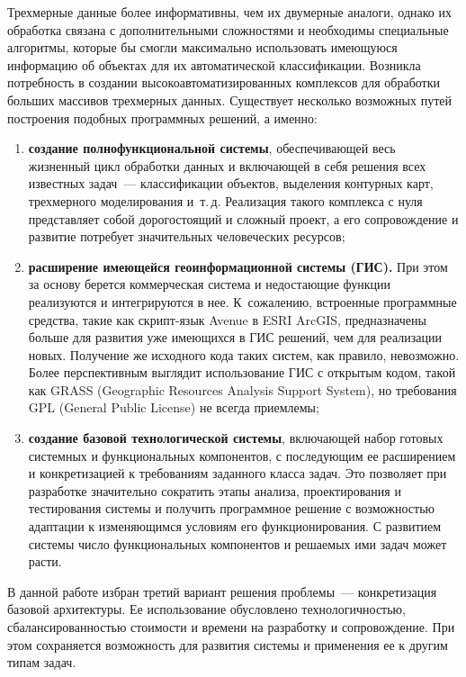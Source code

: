 \begin{multicols}{2}
Трехмерные данные более информативны, чем их двумерные аналоги, однако их 
обработка связана с дополнительными сложностями и необходимы 
специальные алгоритмы, которые бы смогли максимально использовать 
имеющуюся информацию об объектах для их автоматической классификации. 
Возникла потребность в создании высокоавтоматизированных комплексов для 
обработки больших массивов трехмерных данных. Существует несколько возможных 
путей построения подобных программных решений, а именно:
   \begin{enumerate}[(1)]
   \item \textbf{создание полнофункциональной системы}, обеспечивающей 
весь жизненный цикл обработки данных и включающей в себя решения всех 
известных задач~--- классификации объектов, выделения контурных карт, 
трехмерного моделирования и~т.\,д. Реализация такого комплекса с нуля 
представляет собой дорогостоящий и сложный проект, а его сопровождение и 
развитие потребует значительных человеческих ресурсов;
\item \textbf{расширение имеющейся геоинформационной сис\-те\-мы (ГИС).} При этом за основу берется 
коммерческая система и не\-дос\-та\-ющие функции реализуются и интегрируются в 
нее. К~сожалению, встроенные программные средства, такие как скрипт-язык 
Avenue в ESRI ArcGIS, предназначены больше для развития уже имеющихся в 
ГИС решений, чем для реализации новых. Получение же исходного кода таких 
систем, как правило, невозможно. Более перспективным выглядит 
использование ГИС с открытым кодом, такой как GRASS (Geographic Resources Analysis Support System), но требования 
GPL (General Public License) не всегда приемлемы;
\item \textbf{создание базовой технологической системы}, включающей 
набор готовых системных и функциональных компонентов, с по\-сле\-ду\-ющим ее 
расширением и конкретизацией к требованиям заданного класса задач. Это 
позволяет при разработке значительно сократить этапы анализа, 
проектирования и тестирования системы и получить программное решение с 
воз\-мож\-ностью адаптации к изменяющимся условиям его функционирования. С 
развитием сис\-те\-мы чис\-ло функциональных компонентов и решаемых ими задач 
может расти.
   \end{enumerate}
   
   В данной работе избран третий вариант решения проблемы~--- 
конкретизация базовой архитектуры. Ее использование обусловлено 
технологичностью, сбалансированностью стоимости и времени на разработку и 
сопровождение. При этом сохраняется возможность для развития системы и 
применения ее к другим типам задач.
   

\end{multicols}
